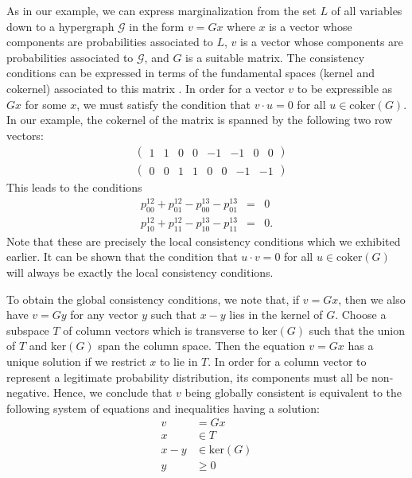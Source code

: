 As in our example, we can express marginalization from the set $L$ of
all variables down to a hypergraph $\mathcal{G}$ in the form $v = Gx$
where $x$ is a vector whose components are probabilities associated to
$L$, $v$ is a vector whose components are probabilities associated to
$\mathcal {G}$, and $G$ is a suitable matrix.  The consistency
conditions can be expressed in terms of the fundamental spaces (kernel
and cokernel) associated to this matrix \cite{Strang1993}.  In order for a vector $v$ to
be expressible as $Gx$ for some $x$, we must satisfy the condition
that $v\cdot u = 0$ for all $u \in \mathrm{coker} (G)$.  In our
example, the cokernel of the matrix is spanned by the following two
row vectors:
\begin{eqnarray}
 &\begin{pmatrix}
  1 & 1 & 0 & 0 & -1 & -1 & 0 & 0
 \end{pmatrix}\\
 &\begin{pmatrix}
 0 & 0 & 1 & 1 & 0 & 0 & -1 & -1
 \end{pmatrix}
\end{eqnarray}
This leads to the conditions
\begin{eqnarray}
 p^{12}_{00} + p^{12}_{01} - p^{13}_{00} - p^{13}_{01} &=& 0 \\
 p^{12}_{10} + p^{12}_{11} - p^{13}_{10} - p^{13}_{11} &=& 0 .
\end{eqnarray}
Note that these are precisely the local consistency conditions which we
exhibited earlier.  It can be shown that the condition that $u \cdot v
= 0$ for all $u \in \mathrm{coker} (G)$ will always be exactly the
local consistency conditions.

To obtain the global consistency conditions, we note that, if $v =
Gx$, then we also have $v = Gy$ for any vector $y$ such that $x-y$
lies in the kernel of $G$.  Choose a subspace $T$ of column vectors
which is transverse to $\mathrm{ker}(G)$ such that the union of $T$
and $\mathrm{ker}(G)$ span the column space.  Then the equation $v =
Gx$ has a unique solution if we restrict $x$ to lie in $T$.  In order
for a column vector to represent a legitimate probability
distribution, its components must all be non-negative.  Hence, we
conclude that $v$ being globally consistent is equivalent to the
following system of equations and inequalities having a solution:
\begin{equation}
\begin{aligned}\label{eq:globalconsistencyconditions}
 v &= Gx \\
 x &\in T \\
 x - y &\in \mathrm{ker}(G) \\
 y &\ge 0
\end{aligned}
\end{equation}

